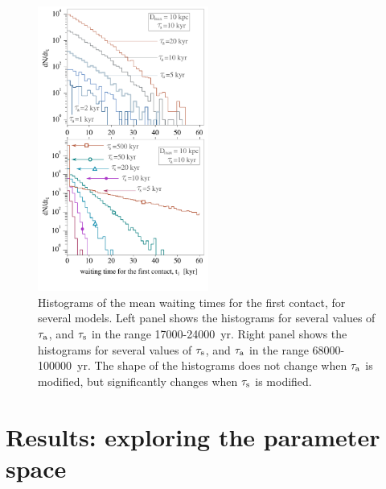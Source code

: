 \documentclass[crop]{CSLB}
\begin{document}
\begin{figure}
   \centering
   \includegraphics[width=0.5\textwidth]{F_waiting_for_1C.pdf}
   \caption{
Histograms of the mean waiting times for the first contact, for
several models.
%
   Left panel shows the histograms for several values of $\tau_{\rm a}$, and
   $\tau_{\rm s}$ in the range 17000-24000~yr.
%
   Right panel shows the histograms for several values of $\tau_{\rm
   s}$, and
   $\tau_{\rm a}$ in the range 68000-100000~yr.
%
   The shape of the histograms does not change when $\tau_{\rm a}$ is
   modified, but significantly changes when $\tau_{\rm s}$ is modified. 
%
   }
   \label{F_waiting_for_1C}
\end{figure}



\section{Results: exploring the parameter space}\label{S_results}
\end{document}

